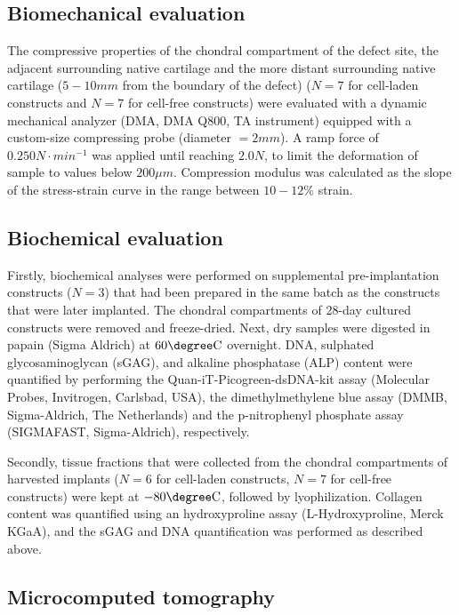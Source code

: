 \documentclass[twocolumn, empirical, authordate, issue]{jote-new-article}
\begin{document}
\subsection{Biomechanical evaluation} 

The compressive properties of the chondral compartment of the defect site, the adjacent surrounding native cartilage and the more distant surrounding native cartilage ($5 - 10 mm$ from the boundary of the defect) ($N=7$ for cell-laden constructs and $N=7$ for cell-free constructs) were evaluated with a dynamic mechanical analyzer (DMA, DMA Q800, TA instrument) equipped with a custom-size compressing probe (diameter $= 2 mm$). A ramp force of $ 0.250 N\cdot min^{-1} $ was applied until reaching $2.0 N$, to limit the deformation of sample to values below $200 \mu m$. Compression modulus was calculated as the slope of the stress-strain curve in the range between $10-12 \%$ strain.

\subsection{Biochemical evaluation} 

Firstly, biochemical analyses were performed on supplemental pre-implantation constructs ($ N=3 $) that had been prepared in the same batch as the constructs that were later implanted. The chondral compartments of 28-day cultured constructs were removed and freeze-dried. Next, dry samples were digested in papain (Sigma Aldrich) at $60\degree \text{C}$ overnight. DNA, sulphated glycosaminoglycan (sGAG), and alkaline phosphatase (ALP) content were quantified by performing the Quan-iT-Picogreen-dsDNA-kit assay (Molecular Probes, Invitrogen, Carlsbad, USA), the dimethylmethylene blue assay (DMMB, Sigma-Aldrich, The Netherlands) and the p-nitrophenyl phosphate assay (SIGMAFAST\texttrademark, Sigma-Aldrich), respectively.

Secondly, tissue fractions that were collected from the chondral compartments of harvested implants ($ N=6 $ for cell-laden constructs, $ N=7 $ for cell-free constructs) were kept at $-80\degree \text{C}$, followed by lyophilization. Collagen content was quantified using an hydroxyproline assay (L-Hydroxyproline, Merck KGaA), and the sGAG and DNA quantification was performed as described above.

\subsection{Microcomputed tomography} 
\end{document}
